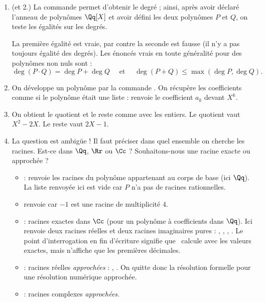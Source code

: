 \documentclass[class=report,crop=false]{standalone}
\begin{document}
\begin{enumerate}
  \item (et 2.) La commande  permet d'obtenir le degré ; ainsi, 
  après avoir déclaré l'anneau de polynômes $\Qq[X]$ et avoir défini les deux polynômes 
  $P$ et $Q$, on teste les égalités sur les degrés.
  

  La première égalité est vraie, par contre la seconde est fausse (il n'y a pas toujours égalité des degrés).
  Les énoncés vrais en toute généralité pour des polynômes non nuls sont :
  $$\deg(P \cdot Q) = \deg P + \deg Q \quad\text{ et }\quad \deg(P + Q) \le \max( \deg P, \deg Q ).$$

  \setcounter{enumi}{2}
  \item On développe un polynôme par la commande .
  On récupère les coefficients comme si le polynôme était une liste :
   renvoie le coefficient $a_k$ devant $X^k$.
  
  \item On obtient le quotient et le reste comme avec les entiers.
  Le quotient  vaut $X^2 - 2X$. 
  Le reste  vaut $2X - 1$.
  
  \item La question est ambigüe ! Il faut préciser dans quel ensemble on cherche les racines.
  Est-ce dans $\Qq$, $\Rr$ ou $\Cc$ ? Souhaitons-nous une racine exacte ou approchée ?
  \begin{itemize}
    \item {} : renvoie les racines du polynôme appartenant au corps de base (ici $\Qq$). 
    La liste renvoyée ici est vide car $P$ n'a pas de racines rationnelles.
    \item {} renvoie \codeinline{[(-1, 4)]} car $-1$ est une racine de multiplicité $4$.
    \item {} : racines exactes dans $\Cc$ (pour un polynôme à coefficients dans $\Qq$).
    Ici renvoie deux racines réelles et deux racines imaginaires pures :
    ,
    , 
    ,
    . 
    Le point d'interrogation en fin d'écriture signifie que \Sage\ calcule avec les valeurs exactes, 
    mais n'affiche que les premières décimales.
    \item {} : racines réelles \emph{approchées} :
    , . On quitte donc la résolution formelle
    pour une résolution numérique approchée.
    \item {} : racines complexes \emph{approchées}.        
  \end{itemize}
\end{enumerate}
\end{document}
